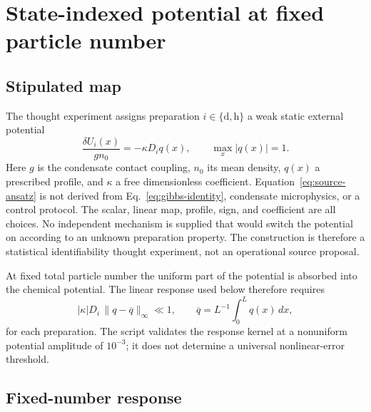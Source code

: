\documentclass[aps,prd,twocolumn,superscriptaddress,nofootinbib,floatfix]{revtex4-2}
\newcommand{\Drel}{D}
\begin{document}
\section{State-indexed potential at fixed particle number}
\label{sec:source}

\subsection{Stipulated map}

The thought experiment assigns preparation $i\in\{\mathrm d,\mathrm h\}$ a weak static external potential
\begin{equation}
 \frac{\delta U_i(x)}{g n_0}
 =-\kappa\Drel_i q(x),
 \qquad \max_x|q(x)|=1.
 \label{eq:source-ansatz}
\end{equation}
Here $g$ is the condensate contact coupling, $n_0$ its mean density, $q(x)$ a prescribed profile, and $\kappa$ a free dimensionless coefficient. Equation~\eqref{eq:source-ansatz} is not derived from Eq.~\eqref{eq:gibbs-identity}, condensate microphysics, or a control protocol. The scalar, linear map, profile, sign, and coefficient are all choices. No independent mechanism is supplied that would switch the potential on according to an unknown preparation property. The construction is therefore a statistical identifiability thought experiment, not an operational source proposal.

At fixed total particle number the uniform part of the potential is absorbed into the chemical potential. The linear response used below therefore requires
\begin{equation}
 |\kappa|\Drel_i\,\|q-\overline q\|_\infty\ll1,
 \qquad \overline q=L^{-1}\!\int_0^L q(x)\,dx,
 \label{eq:weak-response-condition}
\end{equation}
for each preparation. The script validates the response kernel at a nonuniform potential amplitude of $10^{-3}$; it does not determine a universal nonlinear-error threshold.

\subsection{Fixed-number response}
\end{document}
